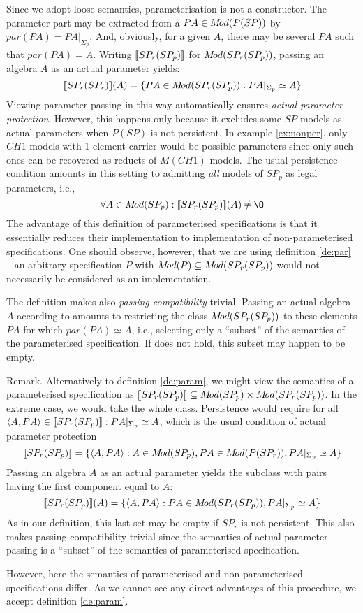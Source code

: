 Since we adopt loose semantics, parameterisation is not a constructor.
The parameter part may be extracted from a $PA\in M\!od(P(SP))$ by $par(PA)=PA|_{\Sigma_p}$. And, obviously, for a given $A$, there may be several $PA$ such that $par(PA)=A$. Writing $[\![ SP_r(SP_p)]\!]$ for $M\!od(SP_r(SP_p))$, passing an algebra $A$ as an actual parameter yields: \begin{equation}\label{eq:apass}
[\![SP_r(SP_r)]\!](A) = \{PA\in M\!od(SP_r(SP_p)) : 
PA|_{\Sigma_p}\simeq A \}
\end{equation}
Viewing parameter passing in this way automatically ensures {\em actual parameter protection}. However, this happens only because it excludes some $SP$ models as actual parameters when $P(SP)$ is not persistent. In example \ref{ex:nonper}, only
$CH1$ models with 1-element carrier would be possible parameters since only such ones can be recovered as reducts of $M(CH1)$ models. The usual persistence condition amounts in this setting to admitting {\em all} models of $SP_p$ as legal parameters, i.e., \begin{equation}\label{eq:pers}
\forall A\in \Mod(SP_p) : \inter{SP_r(SP_p)}(A) \Not= \es \end{equation}
The advantage of this definition of parameterised specifications is that it essentially reduces their implementation to implementation of non-parameterised specifications. One should observe, however, that we are using definition \ref{de:par} -- an arbitrary
specification $P$ with $M\!od(P)\subseteq M\!od(SP_r(SP_p))$ would not necessarily be considered as an implementation. 

The definition makes also {\em passing compatibility} trivial. Passing an actual algebra $A$ according to  amounts to restricting the class $M\!od(SP_r(SP_p))$ to these elements $PA$ for which $par(PA)\simeq A$, i.e., selecting only a ``subset'' of the semantics of the parameterised specification. If  does not hold, this subset may happen to be empty. 

\begin{SREMARK}{Remark.}
Alternatively to definition \ref{de:param}, 
we might view the semantics of a parameterised specification as $[\![SP_r(SP_p)]\!]\subseteq M\!od(SP_p)\times M\!od(SP_r(SP_p))$. In the extreme case, we would take the whole class. Persistence would require for all $\langle A,PA\rangle\in[\![SP_r(SP_p)]\!] : 
PA|_{\Sigma_p} \simeq A$, which is the usual condition of actual parameter protection \[
[\![SP_r(SP_p)]\!] = \{\langle A,PA\rangle: A\in M\!od(SP_p), PA\in M\!od(P(SP_r)), 
PA|_{\Sigma_p}\simeq A\}
\]
Passing an algebra $A$ as an actual parameter yields the subclass with pairs having the first component equal to $A$: \[
[\![SP_r(SP_p)]\!](A) = \{\langle A,PA\rangle:PA\in M\!od(SP_r(SP_p)), 
PA|_{\Sigma_p}\simeq A\}
\]
As in our definition, this last set may be empty if $SP_r$ is not persistent.
This also makes passing compatibility trivial since the semantics of actual parameter passing is a ``subset'' of the semantics of parameterised specification.

However, here the semantics of parameterised and non-parameterised specifications differ. As we cannot see any direct advantages of this procedure, we accept definition \ref{de:param}. \end{SREMARK}
